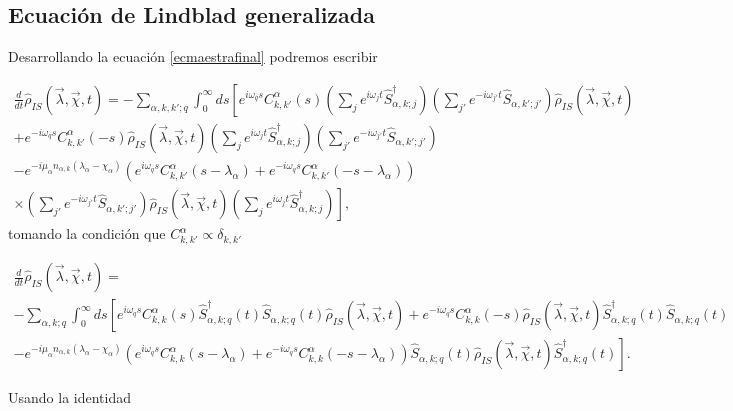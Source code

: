 \begin{appendixs}
\subsection{Ecuación de Lindblad generalizada}
Desarrollando la ecuación \ref{ecmaestrafinal} podremos escribir

\begin{multline*}
    \frac{d}{dt}\hat{\rho}_{IS}(\vec{\lambda},\vec{\chi},t) = - \sum_{\alpha,k,k';q} \int_{0}^{\infty}ds \left[e^{i\omega_{q}s}C^{\alpha}_{k,k'}(s) \left(\sum_{j}e^{i\omega_{j}t}\hat{S}^{\dagger}_{\alpha,k;j} \right)\left(\sum_{j'}e^{-i\omega_{j'}t}\hat{S}_{\alpha,k';j'} \right)\hat{\rho}_{IS}(\vec{\lambda},\vec{\chi},t)  \right. \\
    \left. +  e^{-i\omega_{q}s}C^{\alpha}_{k,k'}(-s) \hat{\rho}_{IS}(\vec{\lambda},\vec{\chi},t) \left(\sum_{j}e^{i\omega_{j}t}\hat{S}^{\dagger}_{\alpha,k;j} \right)\left(\sum_{j'}e^{-i\omega_{j'}t}\hat{S}_{\alpha,k';j'} \right)\right. \\
    \left. - e^{-i\mu_{\alpha}n_{\alpha,k}(\lambda_{\alpha}-\chi_{\alpha})}(e^{i\omega_{q}s}C^{\alpha}_{k,k'}(s-\lambda_{\alpha}) + e^{-i\omega_{q}s}C^{\alpha}_{k,k'}(-s-\lambda_{\alpha}) ) \right.\\
    \left.\times \left(\sum_{j'}e^{-i\omega_{j'}t}\hat{S}_{\alpha,k';j'} \right)\hat{\rho}_{IS}(\vec{\lambda},\vec{\chi},t) \left(\sum_{j}e^{i\omega_{j}t}\hat{S}^{\dagger}_{\alpha,k;j} \right)    \right],   
\end{multline*}
tomando la condición que $C_{k,k'}^{\alpha} \propto \delta_{k,k'}$

\begin{multline*}
    \frac{d}{dt}\hat{\rho}_{IS}(\vec{\lambda},\vec{\chi},t) = \\
     - \sum_{\alpha,k;q} \int_{0}^{\infty}ds \left[e^{i\omega_{q}s}C^{\alpha}_{k,k}(s) \hat{S}^{\dagger}_{\alpha,k;q}(t)\hat{S}_{\alpha,k;q}(t)\hat{\rho}_{IS}(\vec{\lambda},\vec{\chi},t)  +  e^{-i\omega_{q}s}C^{\alpha}_{k,k}(-s) \hat{\rho}_{IS}(\vec{\lambda},\vec{\chi},t) \hat{S}^{\dagger}_{\alpha,k;q}(t) \hat{S}_{\alpha,k;q}(t) \right. \\
    \left. - e^{-i\mu_{\alpha}n_{\alpha,k}(\lambda_{\alpha}-\chi_{\alpha})}(e^{i\omega_{q}s}C^{\alpha}_{k,k}(s-\lambda_{\alpha}) + e^{-i\omega_{q}s}C^{\alpha}_{k,k}(-s-\lambda_{\alpha}) ) \hat{S}_{\alpha,k;q}(t) \hat{\rho}_{IS}(\vec{\lambda},\vec{\chi},t) \hat{S}^{\dagger}_{\alpha,k;q}(t)    \right].  
\end{multline*}

Usando la identidad 


\end{appendixs}
